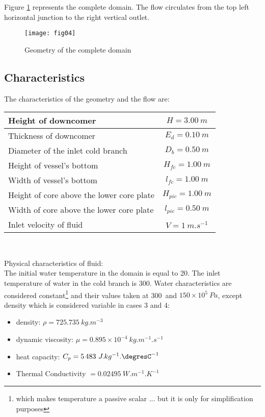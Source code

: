 Figure \ref{figante21} represents the complete domain. The flow circulates from
the top left horizontal junction to the right vertical outlet.

\begin{figure}[h!]
\begin{center}
\texttt{[image: fig04]}
\caption{Geometry of the complete domain}
\label{figante21}
\end{center}
\end{figure}


        \subsection{Characteristics}

The characteristics of the geometry and the flow are:
\begin{center}
\begin{tabular}{|l|c|}
\hline
Height of downcomer & $H = 3.00\ m$ \\
\hline
Thickness of downcomer & $E_{d} = 0.10\ m$ \\
\hline
Diameter of the inlet cold branch & $D_{b} = 0.50\ m$ \\
\hline
Height of vessel's bottom & $H_{fc} = 1.00\ m$ \\
\hline
Width of vessel's bottom & $l_{fc} = 1.00\ m$ \\
\hline
Height of core above the lower core plate & $H_{pic} = 1.00\ m$ \\
\hline
Width of core above the lower core plate & $l_{pic} = 0.50\ m$ \\
\hline
Inlet velocity of fluid & $V = 1\ m.s^{-1}$ \\
\hline
\end{tabular}\\
\end{center}

Physical characteristics of fluid:\\
The initial water temperature in the domain is equal to 20\degresC.
The inlet temperature of water in the cold branch is 300\degresC.
Water characteristics are considered constant\footnote{which makes temperature a
passive scalar ... but it is only for simplification purposes} and their values taken at
300\degresC\ and $150\times 10^{5}\ Pa$, except density which is considered
variable in cases 3 and 4:
\begin{itemize}
        \item density: $\rho = 725.735\ kg.m^{-3}$
        \item dynamic viscosity: $\mu = 0.895\times10^{-4}\ kg.m^{-1}.s^{-1}$
        \item heat capacity: $C_{p} = 5\,483\ J.kg^{-1}.\mbox{\degresC}^{-1}$
        \item Thermal Conductivity $ = 0.02495\ W.m^{-1}.K^{-1}$
\end{itemize}




